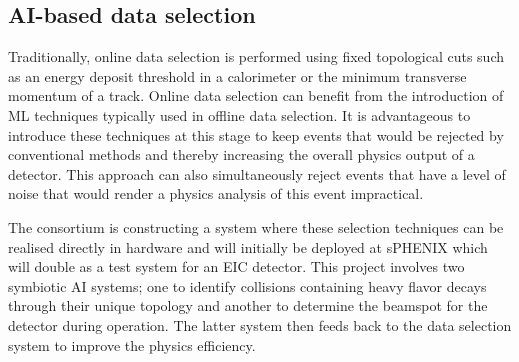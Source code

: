 \subsection{AI-based data selection}

Traditionally, online data selection is performed using fixed topological cuts such as an energy deposit threshold in a calorimeter or the minimum transverse momentum of a track. Online data selection can benefit from the introduction of ML techniques typically used in offline data selection. It is advantageous to introduce these techniques at this stage to keep events that would be rejected by conventional methods and thereby increasing the overall physics output of a detector. This approach can also simultaneously reject events that have a level of noise that would render a physics analysis of this event impractical.

The consortium is constructing a system where these selection techniques can be realised directly in hardware and will initially be deployed at sPHENIX which will double as a test system for an EIC detector. This project involves two symbiotic AI systems; one to identify collisions containing heavy flavor decays through their unique topology and another to determine the beamspot for the detector during operation. The latter system then feeds back to the data selection system to improve the physics efficiency.



